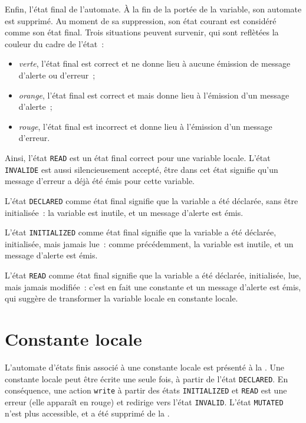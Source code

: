 Enfin, l'état final de l'automate. À la fin de la portée de la variable, son automate est supprimé. Au moment de sa suppression, son état courant est considéré comme son état final. Trois situations peuvent survenir, qui sont reflètées la couleur du cadre de l'état~:
\begin{itemize}
  \item \emph{verte}, l'état final est correct et ne donne lieu à aucune émission de message d'alerte ou d'erreur~;
  \item \emph{orange}, l'état final est correct et mais donne lieu à l'émission d'un message d'alerte~;
  \item \emph{rouge}, l'état final est incorrect et donne lieu à l'émission d'un message d'erreur.
\end{itemize}

Ainsi, l'état \texttt{READ} est un état final correct pour une variable locale. L'état \texttt{INVALIDE} est aussi silencieusement accepté, être dans cet état signifie qu'un message d'erreur a déjà été émis pour cette variable.

L'état \texttt{DECLARED} comme état final signifie que la variable a été déclarée, sans être initialisée~: la variable est inutile, et un message d'alerte est émis.

L'état \texttt{INITIALIZED} comme état final signifie que la variable a été déclarée, initialisée, mais jamais lue~: comme précédemment, la variable est inutile, et un message d'alerte est émis.

L'état \texttt{READ} comme état final signifie que la variable a été déclarée, initialisée, lue, mais jamais modifiée~: c'est en fait une constante et un message d'alerte est émis, qui suggère de transformer la variable locale en constante locale.



\section{Constante locale}

L'automate d'états finis associé à une constante locale est présenté à la . Une constante locale peut être écrite une seule fois, à partir de l'état \texttt{DECLARED}. En conséquence, une action \texttt{write} à partir des états \texttt{INITIALIZED} et \texttt{READ} est une erreur (elle apparaît en rouge) et redirige vers l'état \texttt{INVALID}. L'état \texttt{MUTATED} n'est plus accessible, et a été supprimé de la .




